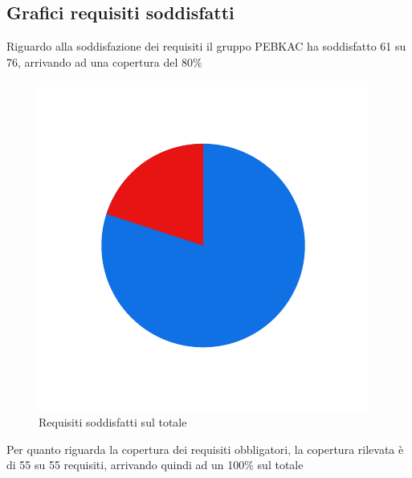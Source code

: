 \subsection{Grafici requisiti soddisfatti}
Riguardo alla soddisfazione dei requisiti il gruppo PEBKAC ha soddisfatto 61 su 76,
arrivando ad una copertura del 80\%
\begin{figure}[H]
    \centering
    \includegraphics[width=\textwidth]{images/requisiti_tot.png}
    \caption{Requisiti soddisfatti sul totale}
    \label{fig:Requisiti Totali}
\end{figure}
\newpage
Per quanto riguarda la copertura dei requisiti obbligatori, la copertura rilevata è di 55 su 55
requisiti, arrivando quindi ad un 100\% sul totale

